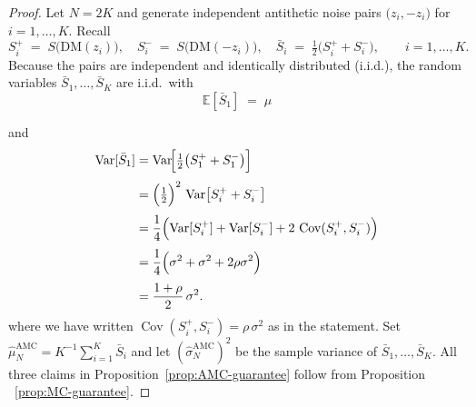 \documentclass[10pt,a4paper]{amsart}
\DeclareMathOperator{\Cov}{Cov}
\DeclareMathOperator{\Var}{Var}
\newcommand{\AMC}{\text{AMC}}
\newcommand{\DM}{\text{DM}}
\newcommand{\bE}{\mathbb{E}}
\begin{document}
\begin{proof}\label{proof: proof AMC-guarantee}
Let $N=2K$ and generate independent antithetic noise pairs
$\bigl(z_i,-z_i\bigr)$ for $i=1,\dots,K$.  
Recall
\[
S_i^+ \;=\; S\!\bigl(\DM(z_i)\bigr),
\quad
S_i^- \;=\; S\!\bigl(\DM(-z_i)\bigr),
\quad
\bar S_i \;=\;\tfrac12\bigl(S_i^+ + S_i^-\bigr),
\qquad
i=1,\dots,K .
\]
Because the pairs are independent and identically distributed (i.i.d.),
the random variables $\bar S_1,\dots,\bar S_K$ are i.i.d.\ with
\[
\bE[\bar S_1] \;=\; \mu\]

and
\begin{align}
\Var[\bar S_1]
&=\Var\!\Bigl[\tfrac12\bigl(S_1^{+}+S_1^{-}\bigr)\Bigr] \\[3pt]
&=\Bigl(\tfrac12\Bigr)^{2}\,
  \Var\!\left[S_i^{+}+S_i^{-}\right] \\[3pt]
&=\frac14\Bigl(
     \Var[S_i^{+}]
     +\Var[S_i^{-}]
     +2\,\Cov(S_i^{+},S_i^{-})
   \Bigr) \\[3pt]
&=\frac14\Bigl(
     \sigma^{2}
     +\sigma^{2}
     +2\rho\sigma^{2}
   \Bigr) \\[3pt]
&=\frac{1+\rho}{2}\,\sigma^{2}.
\end{align}
where we have written $\Cov(S_i^+,S_i^-)=\rho\,\sigma^{2}$ as in the statement.
Set 
\(
\hat\mu_N^\AMC = K^{-1}\sum_{i=1}^{K}\bar S_i
\)
and let $(\hat\sigma_N^\AMC)^2$ be the sample variance of $\bar S_1,\dots,\bar S_K$. All three claims in Proposition~\ref{prop:AMC-guarantee} follow from Proposition ~\ref{prop:MC-guarantee}.

\end{proof}
\end{document}
